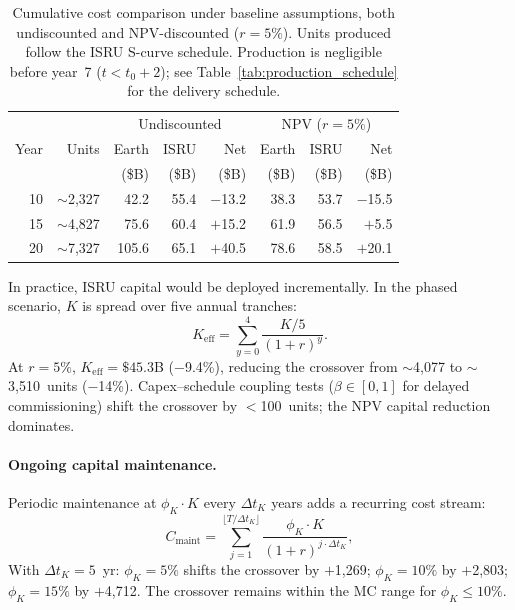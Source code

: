 \documentclass[preprint,12pt]{elsarticle}
\begin{document}
\begin{table}[htbp]
\centering
\caption{Cumulative cost comparison under baseline assumptions, both undiscounted and NPV-discounted ($r = 5\%$). Units produced follow the ISRU S-curve schedule. Production is negligible before year~7 ($t < t_0 + 2$); see Table~\ref{tab:production_schedule} for the delivery schedule.}
\label{tab:cumulative}
\begin{tabular}{@{}rr|rrr|rrr@{}}
\toprule
 & & \multicolumn{3}{c|}{Undiscounted} & \multicolumn{3}{c}{NPV ($r = 5\%$)} \\
Year & Units & Earth & ISRU & Net & Earth & ISRU & Net \\
 & & (\$B) & (\$B) & (\$B) & (\$B) & (\$B) & (\$B) \\
\midrule
10 & $\sim$2{,}327 & 42.2  & 55.4   & $-$13.2 & 38.3  & 53.7  & $-$15.5 \\
15 & $\sim$4{,}827 & 75.6  & 60.4   & $+$15.2 & 61.9  & 56.5  & $+$5.5  \\
20 & $\sim$7{,}327 & 105.6 & 65.1   & $+$40.5 & 78.6  & 58.5  & $+$20.1 \\
\bottomrule
\end{tabular}
\end{table}

In practice, ISRU capital would be deployed incrementally. In the phased scenario, $K$ is spread over five annual tranches:
\begin{equation}
  K_{\mathrm{eff}} = \sum_{y=0}^{4} \frac{K/5}{(1+r)^y}.
  \label{eq:phased_capital}
\end{equation}
At $r = 5\%$, $K_{\mathrm{eff}} = \$45.3$B ($-$9.4\%), reducing the crossover from $\sim$4{,}077 to $\sim$3{,}510~units ($-$14\%). Capex--schedule coupling tests ($\beta \in [0, 1]$ for delayed commissioning) shift the crossover by $<$100~units; the NPV capital reduction dominates.

\paragraph{Ongoing capital maintenance.} Periodic maintenance at $\phi_K \cdot K$ every $\Delta t_K$ years adds a recurring cost stream:
\begin{equation}
  C_{\mathrm{maint}} = \sum_{j=1}^{\lfloor T/\Delta t_K \rfloor} \frac{\phi_K \cdot K}{(1+r)^{j \cdot \Delta t_K}},
\end{equation}
With $\Delta t_K = 5$~yr: $\phi_K = 5\%$ shifts the crossover by $+$1{,}269; $\phi_K = 10\%$ by $+$2{,}803; $\phi_K = 15\%$ by $+$4{,}712. The crossover remains within the MC range for $\phi_K \leq 10\%$.
\end{document}
